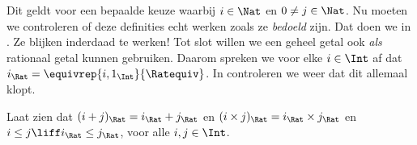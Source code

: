 \documentclass[../../../include/open-logic-section]{subfiles}
\begin{document}
Dit geldt voor een bepaalde keuze waarbij $i \in \Nat$ en $0 \neq j \in \Nat$.
Nu moeten we controleren of deze definities echt werken zoals ze
\emph{bedoeld} zijn. Dat doen we in . Ze blijken
inderdaad te werken!{} Tot slot willen we een geheel getal ook \emph{als}
rationaal getal kunnen gebruiken. Daarom spreken we voor elke $i \in
\Int$ af dat $i_\Rat = \equivrep{i, 1_\Int}{\Ratequiv}$. In
 controleren we weer dat dit allemaal klopt.
\begin{prob}
Laat zien dat $(i + j)_\Rat = i_\Rat+ j_\Rat$ en $(i \times j)_\Rat =
i_\Rat \times j_\Rat$ en $i \leq j \liff i_\Rat \leq j_\Rat$, voor alle
$i, j \in \Int$.
\end{prob}
\end{document}
